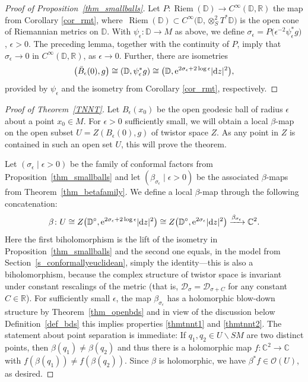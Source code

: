 \documentclass[pdftex]{sigma}
\numberwithin{equation}{section}
\theoremstyle{definition}
\newcommand{\R}{\mathbb{R}} %
\newcommand{\C}{\mathbb{C}} %
\newcommand{\DD}{\mathbb{D}} %
\newcommand{\1}{{\bf 1}}
\newcommand{\D}{\mathscr{D}}
\DeclareMathOperator{\Riem}{Riem}
\begin{document}
\begin{proof}[Proof of Proposition~\ref{thm_smallballs}]
Let $P\colon \Riem(\DD)\rightarrow C^\infty(\DD,\R)$ the map from Corollary \ref{cor_rmt}, where~${\Riem(\DD)\subset C^\infty\bigl(\DD,\otimes^2_ST^*\DD\bigr)}$ is the open cone of Riemannian metrics on $\DD$. With $\psi_\epsilon\colon \DD\rightarrow M$ as above, we define
$\sigma_\epsilon = P\bigl(\epsilon^{-2}\psi_\epsilon^*g\bigr)$, $ \epsilon >0$.
The preceding lemma, together with the continuity of $P$, imply that $\sigma_\epsilon\rightarrow 0$ in $C^\infty(\DD,\R)$, as $\epsilon\rightarrow 0$. Further, there are isometries
\[
	\bigl(\bar B_\epsilon(0),g\bigr)\cong (\DD,\psi_\epsilon^* g)\cong \bigl(\DD, {\rm e}^{2\sigma_\epsilon + 2\log \epsilon}|{\rm d}z|^2\bigr),
\]
provided by $\psi_\epsilon$ and the isometry from Corollary \ref{cor_rmt}, respectively.
\end{proof}



\begin{proof}[Proof of Theorem~\ref{TNNT}] Let $B_\epsilon(x_0)$ be the open geodesic ball of radius $\epsilon$ about a point $x_0\in M$.
For $\epsilon>0$ sufficiently small, we will obtain a local $\beta$-map on the open subset $U=Z(B_\epsilon(0),g)$ of twistor space $Z$. As any point in $Z$ is contained in such an open set $U$, this will prove the theorem.

Let $(\sigma_\epsilon\mid \epsilon >0)$ be the family of conformal factors from Proposition~\ref{thm_smallballs} and let $(\beta_{\sigma_\epsilon}\mid \epsilon>0)$ be the associated $\beta$-maps from Theorem~\ref{thm_betafamily}. We define a local $\beta$-map through the following concatenation:
\[
	\beta\colon U \cong Z\bigl(\DD^\circ,{\rm e}^{2\sigma_\epsilon+2\log \epsilon}|{\rm d}z|^2\bigr) \cong Z\bigl(\DD^\circ,{\rm e}^{2\sigma_\epsilon}|{\rm d}z|^2\bigr) \xrightarrow{\beta_{\sigma_\epsilon}}\C^2.
\]
Here the first biholomorphism is the lift of the isometry in Proposition~\ref{thm_smallballs} and the second one equals, in the model from Section~\ref{s_conformallyeuclidean}, simply the identity---this is also a biholomorphism, because the complex structure of twistor space is invariant under constant rescalings of the metric (that is, $\D_{\sigma} = \D_{\sigma+C}$ for any constant $C\in \R$).
For sufficiently small $\epsilon$, the map $\beta_{\sigma_\epsilon}$ has a holomorphic blow-down structure by Theorem~\ref{thm_openbds}
and in view of the discussion below Definition~\ref{def_bds} this implies properties \ref{thmtnnt1} and \ref{thmtnnt2}. The statement about point separation is immediate: If $q_1,q_2\in U\backslash SM$ are two distinct points, then $\beta(q_1)\neq \beta(q_2)$ and thus there is a holomorphic map $f\colon \C^2\rightarrow \C$ with $f(\beta(q_1))\neq f(\beta(q_2))$. Since $\beta$ is holomorphic, we have $\beta^*f\in \mathcal O(U)$, as desired.\end{proof}
\end{document}
